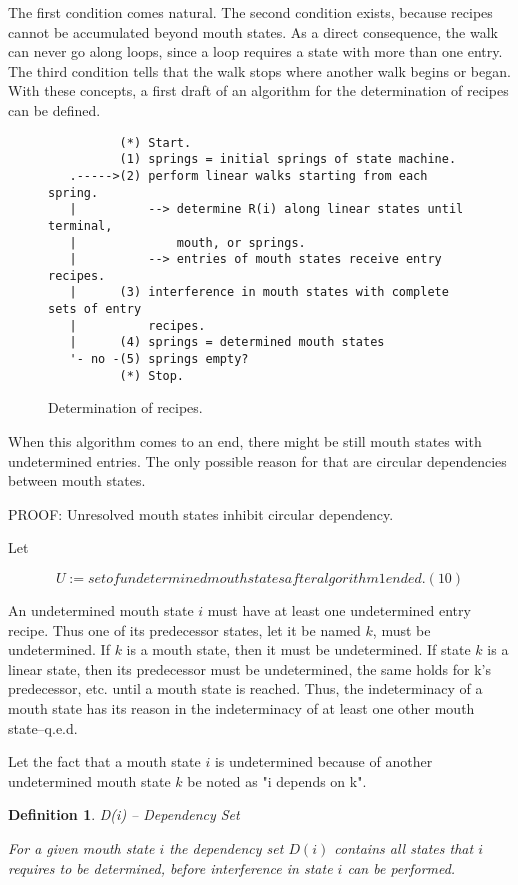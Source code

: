 \documentclass[12pt,a4paper]{scrartcl}
\theoremstyle{break}
\newtheorem{definition}{Definition}
\begin{document}
The first condition comes natural. The second condition exists, because recipes
cannot be accumulated beyond mouth states. As a direct consequence, the walk
can never go along loops, since a loop requires a state with more than one
entry. The third condition tells that the walk stops where another walk begins
or began.  With these concepts, a first draft of an algorithm for the
determination of recipes can be defined.

\begin{figure}[htbp] \leavevmode
\begin{verbatim}
          (*) Start.
          (1) springs = initial springs of state machine.
   .----->(2) perform linear walks starting from each spring.
   |          --> determine R(i) along linear states until terminal,
   |              mouth, or springs.
   |          --> entries of mouth states receive entry recipes.
   |      (3) interference in mouth states with complete sets of entry
   |          recipes.
   |      (4) springs = determined mouth states
   '- no -(5) springs empty?
          (*) Stop.
\end{verbatim}

\caption{Determination of recipes.}
\end{figure}

When this algorithm comes to an end, there might be still mouth states with
undetermined entries. The only possible reason for that are circular
dependencies between mouth states. 

PROOF: Unresolved mouth states inhibit circular dependency.

Let 

\[
        U := set of undetermined mouth states after algorithm 1 ended.       (10)
\]

An undetermined mouth state $i$ must have at least one undetermined entry
recipe. Thus one of its predecessor states, let it be named $k$, must be
undetermined. If $k$ is a mouth state, then it must be undetermined.  If state
$k$ is a linear state, then its predecessor must be undetermined, the same
holds for k's predecessor, etc. until a mouth state is reached. Thus, the
indeterminacy of a mouth state has its reason in the indeterminacy of at least
one other mouth state--q.e.d. 

Let the fact that a mouth state $i$ is undetermined because of another undetermined
mouth state $k$ be noted as "i depends on k". 

\begin{definition}
D(i) -- Dependency Set 

For a given mouth state $i$ the dependency set $D(i)$ contains all states
that $i$ requires to be determined, before interference in state $i$ can be
performed.
\end{definition}
\end{document}
